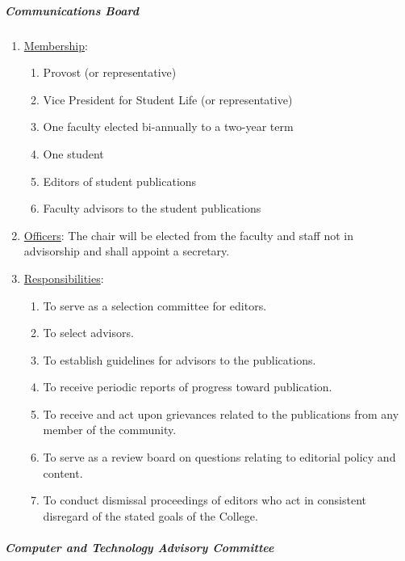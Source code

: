 				\subparagraph{Communications Board}
					\begin{enumerate}[label=\alph*)]
						\item{\underline{Membership}:
							\begin{enumerate}[label=\arabic*)]
								\item{Provost (or representative)}
								\item{Vice President for Student Life (or representative)}
								\item{One faculty elected bi-annually to a two-year term}
								\item{One student}
								\item{Editors of student publications}
								\item{Faculty advisors to the student publications}
							\end{enumerate}
						}
						\item{\underline{Officers}:
							The chair will be elected from the faculty and staff not in advisorship and shall appoint a secretary.
						}
						\item{\underline{Responsibilities}:
							\begin{enumerate}[label=\arabic*)]
								\item{To serve as a selection committee for editors.}
								\item{To select advisors.}
								\item{To establish guidelines for advisors to the publications.}
								\item{To receive periodic reports of progress toward publication.}
								\item{To receive and act upon grievances related to the publications from any member of the community.}
								\item{To serve as a review board on questions relating to editorial policy and content.}
								\item{To conduct dismissal proceedings of editors who act in consistent disregard of the stated goals of the College.}
							\end{enumerate}
						}
					\end{enumerate}
				\subparagraph{Computer and Technology Advisory Committee}
